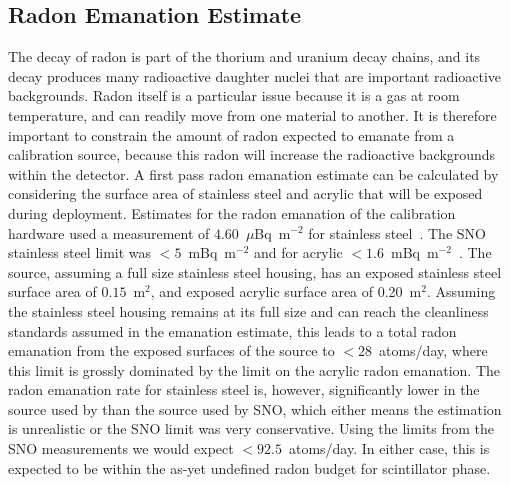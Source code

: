 \subsection{Radon Emanation Estimate}
\label{sec:emanation}
The decay of radon is part of the thorium and uranium decay chains, and its decay produces many radioactive daughter nuclei that are important radioactive backgrounds.
Radon itself is a particular issue because it is a gas at room temperature, and can readily move from one material to another.
It is therefore important to constrain the amount of radon expected to emanate from a calibration source, because this radon will increase the radioactive backgrounds within the detector.
A first pass radon emanation estimate can be calculated by considering the surface area of stainless steel and acrylic that will be exposed during deployment. 
Estimates for the radon emanation of the {\snop} calibration hardware used a measurement of $4.60$~$\mu$Bq~m$^{-2}$ for stainless steel~\cite{kormos:2015}. 
The SNO stainless steel limit was $< 5$~mBq~m$^{-2}$ and for acrylic $< 1.6$~mBq~m$^{-2}$~\cite{Liu:1993}. 
The source, assuming a full size stainless steel housing, has an exposed stainless steel surface area of $0.15$~m$^2$, and exposed acrylic surface area of 0.20~m$^2$. 
Assuming the stainless steel housing remains at its full size and can reach the cleanliness standards assumed in the {\snop} emanation estimate, this leads to a total radon emanation from the exposed surfaces of the source to $<28$~atoms/day, where this limit is grossly dominated by the limit on the acrylic radon emanation. 
The radon emanation rate for stainless steel is, however, significantly lower in the source used by {\snop} than the source used by SNO, which either means the {\snop} estimation is unrealistic or the SNO limit was very conservative. 
Using the limits from the SNO measurements we would expect $<92.5$~atoms/day.
In either case, this is expected to be within the as-yet undefined {\snop} radon budget for scintillator phase.


